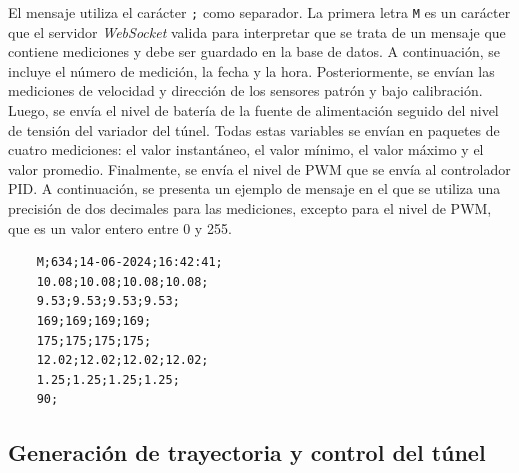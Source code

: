 

El mensaje utiliza el carácter \texttt{;} como separador. La primera letra \texttt{M} es un carácter que el servidor \textit{WebSocket} valida para interpretar que se trata de un mensaje que contiene mediciones y debe ser guardado en la base de datos. A continuación, se incluye el número de medición, la fecha y la hora. Posteriormente, se envían las mediciones de velocidad y dirección de los sensores patrón y bajo calibración. Luego, se envía el nivel de batería de la fuente de alimentación seguido del nivel de tensión del variador del túnel. Todas estas variables se envían en paquetes de cuatro mediciones: el valor instantáneo, el valor mínimo, el valor máximo y el valor promedio. Finalmente, se envía el nivel de PWM que se envía al controlador PID. A continuación, se presenta un ejemplo de mensaje en el que se utiliza una precisión de dos decimales para las mediciones, excepto para el nivel de PWM, que es un valor entero entre 0 y 255.

\begin{verbatim}
    M;634;14-06-2024;16:42:41;
    10.08;10.08;10.08;10.08;
    9.53;9.53;9.53;9.53;
    169;169;169;169;
    175;175;175;175;
    12.02;12.02;12.02;12.02;
    1.25;1.25;1.25;1.25;
    90;
\end{verbatim}

\subsection{Generación de trayectoria y control del túnel}\label{sec:genTrayec}

